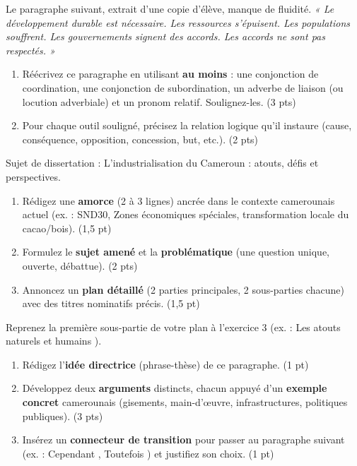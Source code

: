 \documentclass[11pt]{article}
\begin{document}
\begin{exercice}
Le paragraphe suivant, extrait d'une copie d'élève, manque de fluidité.
\textit{« Le développement durable est nécessaire. Les ressources s'épuisent. Les populations souffrent. Les gouvernements signent des accords. Les accords ne sont pas respectés. »}
\begin{enumerate}
    \item Réécrivez ce paragraphe en utilisant \textbf{au moins} : une conjonction de coordination, une conjonction de subordination, un adverbe de liaison (ou locution adverbiale) et un pronom relatif. Soulignez-les. (3 pts)
    \item Pour chaque outil souligné, précisez la relation logique qu'il instaure (cause, conséquence, opposition, concession, but, etc.). (2 pts)
\end{enumerate}
\end{exercice}

\begin{exercice}
Sujet de dissertation : \og L'industrialisation du Cameroun : atouts, défis et perspectives. \fg
\begin{enumerate}
    \item Rédigez une \textbf{amorce} (2 à 3 lignes) ancrée dans le contexte camerounais actuel (ex. : SND30, Zones économiques spéciales, transformation locale du cacao/bois). (1,5 pt)
    \item Formulez le \textbf{sujet amené} et la \textbf{problématique} (une question unique, ouverte, débattue). (2 pts)
    \item Annoncez un \textbf{plan détaillé} (2 parties principales, 2 sous-parties chacune) avec des titres nominatifs précis. (1,5 pt)
\end{enumerate}
\end{exercice}

\begin{exercice}
Reprenez la première sous-partie de votre plan à l'exercice 3 (ex. : \og Les atouts naturels et humains \fg).
\begin{enumerate}
    \item Rédigez l'\textbf{idée directrice} (phrase-thèse) de ce paragraphe. (1 pt)
    \item Développez deux \textbf{arguments} distincts, chacun appuyé d'un \textbf{exemple concret} camerounais (gisements, main-d'œuvre, infrastructures, politiques publiques). (3 pts)
    \item Insérez un \textbf{connecteur de transition} pour passer au paragraphe suivant (ex. : \og Cependant \fg, \og Toutefois \fg) et justifiez son choix. (1 pt)
\end{enumerate}
\end{exercice}
\end{document}
